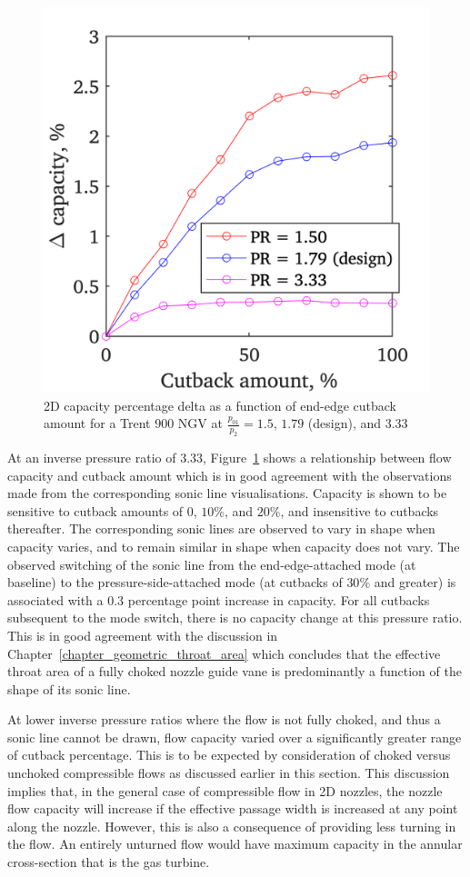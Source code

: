 \documentclass[a4paper, 11pt, oneside]{report}
\begin{document}
\begin{figure}[H]
	\centering
	\includegraphics[width=.45\textwidth]{figs/ss_cutbacks_vs_capacities_pressure_ratios.png}
	\caption{2D capacity percentage delta as a function of end-edge cutback amount for a Trent 900 NGV at $\frac{p_{01}}{p_2}=1.5$, $1.79$ (design), and $3.33$}
    \label{fig:ss_cutbacks_vs_capacities_pressure_ratios}
\end{figure}

At an inverse pressure ratio of $3.33$, Figure~\ref{fig:ss_cutbacks_vs_capacities_pressure_ratios} shows a relationship between flow capacity and cutback amount which is in good agreement with the observations made from the corresponding sonic line visualisations. Capacity is shown to be sensitive to cutback amounts of $0$, $10\%$, and $20\%$, and insensitive to cutbacks thereafter. The corresponding sonic lines are observed to vary in shape when capacity varies, and to remain similar in shape when capacity does not vary. The observed switching of the sonic line from the end-edge-attached mode (at baseline) to the pressure-side-attached mode (at cutbacks of $30\%$ and greater) is associated with a $0.3$ percentage point increase in capacity. For all cutbacks subsequent to the mode switch, there is no capacity change at this pressure ratio. This is in good agreement with the discussion in Chapter~\ref{chapter_geometric_throat_area} which concludes that the effective throat area of a fully choked nozzle guide vane is predominantly a function of the shape of its sonic line.

At lower inverse pressure ratios where the flow is not fully choked, and thus a sonic line cannot be drawn, flow capacity varied over a significantly greater range of cutback percentage. This is to be expected by consideration of choked versus unchoked compressible flows as discussed earlier in this section. This discussion implies that, in the general case of compressible flow in 2D nozzles, the nozzle flow capacity will increase if the effective passage width is increased at any point along the nozzle. However, this is also a consequence of providing less turning in the flow. An entirely unturned flow would have maximum capacity in the annular cross-section that is the gas turbine. 
\end{document}
